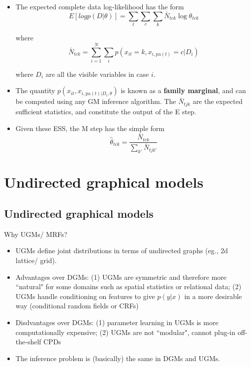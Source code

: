\documentclass[10pt,mathserif]{beamer}
\begin{document}
\begin{frame}{}
\begin{itemize}
    \item The expected complete data log-likelihood has the form
    \begin{equation}
        E [log p(D|\theta)]  = \sum_t\sum_c\sum_k \bar{N}_{tck} \log \theta_{tck}
    \end{equation}
    
    where 
    \begin{equation}
        \bar{N}_{tck} = \sum_{i=1}^N 
        \sum_i p(x_{it}=k,x_{i,\text{pa}(t)}=c|D_i)
    \end{equation}
    
    where $D_i$ are all the visible variables in case $i$.
    
    \item The quantity $p(x_{it},x_{i,\text{pa}(t)|D_{i},\theta})$ is known as a \textbf{family marginal}, and can be computed using any GM inference algorithm. The $\bar{N}_{tjk}$ are the expected sufficient statistics, and constitute the output of the E step.
    
    \item Given these ESS, the M step has the simple form
    \begin{equation}
        \hat{\theta}_{tck} = \frac{\bar{N}_{tck}}{\sum_{k'}\bar{N}_{tjk'}}
    \end{equation}
\end{itemize}
\end{frame}

\section{Undirected graphical models}
\subsection{Undirected graphical models}
\begin{frame}{Why UGMs/ MRFs?}
\begin{itemize}
    \item UGMs define joint distributions in terms of undirected graphs (eg., 2d lattice/ grid).
    \item Advantages over DGMs: (1) UGMs are symmetric and therefore more ``natural" for some domains such as spatial statistics or relational data; (2) UGMs handle conditioning on features to give $p(y|x)$ in a more desirable way (conditional random fields or CRFs)
    \item Disdvantages over DGMs: (1) parameter learning in UGMs is more computationally expensive; (2) UGMs are not ``modular", cannot plug-in off-the-shelf CPDs
    \item The inference problem is (basically) the same in DGMs and UGMs.
\end{itemize}
\end{frame}
\end{document}
